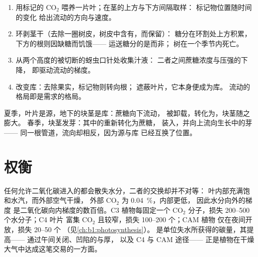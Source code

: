 \begin{method}[读取韧皮部运输实验]\label{met:b1:plant-transport:translocation}
\begin{enumerate}
  \item 用标记的 $\mathrm{CO_2}$ 喂养一片叶；在茎的上方与下方间隔取样：
        标记物位置随时间的变化
        给出流动的方向与速度。
  \item 环剥茎干（去除一圈树皮，树皮中含有，而保留）：
        糖分在环割处上方积累，下方的根则因缺糖而饥饿——
        运送糖分的是而非；
        树在一个季节内死亡。
  \item 从两个高度的被切断的蚜虫口针处收集汁液：
        二者之间蔗糖浓度与压强的下降，
        即驱动流动的梯度。
  \item 改变库：去除果实，标记物则转向根；
        遮蔽叶片，它本身便成为库。
        流动的格局即是需求的格局。
\end{enumerate}
\end{method}

\begin{example}[一株马铃薯的两个季节]\label{ex:b1:plant-transport:potato}
夏季，叶片是源，地下的块茎是库：蔗糖向下流动，
被卸载，转化为，块茎随之膨大。
春季，块茎发芽：其中的重新转化为蔗糖，
装入，并向上流向生长中的芽——
同一根管道，流向却相反，因为源与库
已经互换了位置。
\end{example}

\section{权衡}

\begin{proposition}[水分利用效率]\label{prop:b1:plant-transport:wue}
任何允许二氧化碳进入的都会散失水分，二者的交换却并不对等：
叶内部充满饱和水汽，而外部空气干燥，
外部 $\mathrm{CO_2}$ 为 \qty{0.04}{\%}，内部更低，
因此水分向外的梯度
是二氧化碳向内梯度的数百倍。C3 植物每固定一个
$\mathrm{CO_2}$ 分子，损失 \qtyrange{200}{500}{} 个水分子；C4 叶片
富集 $\mathrm{CO_2}$ 且较窄，损失 \qtyrange{100}{200}{} 个；CAM 植物
仅在夜间开放，损失 \qtyrange{20}{50}{} 个
（见\cref{ch:b1:photosynthesis}）。
\emph{}是单位失水所获得的碳量，其提高——
通过午间关闭、凹陷的与厚，
以及 C4 与 CAM 途径——
正是植物在干燥大气中达成这笔交易的一方面。
\end{proposition}

